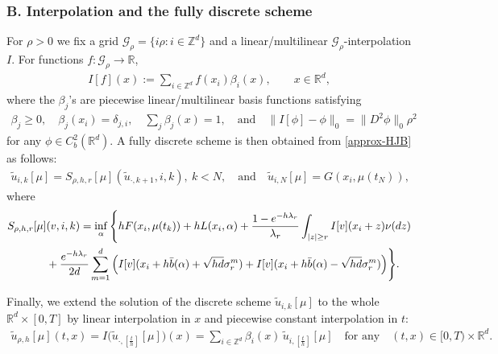 \documentclass[a4paper,  twoside, 10pt, leqno]{amsart}
\newcommand{\Z}{\mathbb{Z}}
\newcommand{\zd}{\mathbb{Z}^d}
\newcommand{\R}{\mathbb{R}}
\newcommand{\rd}{\mathbb{R}^d}
\theoremstyle{remark}
\theoremstyle{definition}
\begin{document}
\subsubsection*{B. Interpolation and the fully discrete scheme}
For $\rho>0$ we fix a grid
    $\mathcal{G}_{\rho} = \{i \rho : i\in \Z^d \}$
and a linear/multilinear $\mathcal{G}_{\rho}$-interpolation $I$. For functions $f: \mathcal{G}_{\rho} \rightarrow \mathbb{R}$,
    \begin{align}\label{linear_interpolation}
        I[f] (x) := \sum_{i\in \Z^d} f(x_i) \beta_i (x), \qquad x \in \R^d,
    \end{align}
   where the $\beta_j$'s are piecewise linear/multilinear basis functions satisfying  
\begin{align*}
   \beta_j\geq 0 , \quad  \beta_j (x_i) = \delta_{j,i},  \quad
   \sum_{j} \beta_j (x) = 1, \quad \text{and} \quad \|I[\phi]
   -\phi\|_{0} = \|D^2\phi\|_0\rho^2 
\end{align*}   
for any $\phi\in C^2_b(\rd)$. A fully discrete scheme is then
obtained from \eqref{approx-HJB} as follows:
\begin{align}\label{schme_HJ}
    \tilde u_{i,k}[\mu] = S_{\rho,h,r} [\mu] (\tilde u_{\cdot,k+1},i,k), \ k<N, \quad \text{and} \quad 
    \tilde u_{i,N}[\mu] = G (x_i, \mu (t_N)), &
\end{align}
where
\begin{align}\label{schme_HJ_S}
  \notag  S_{\rho,h,r} [\mu] & (v,i,k) =   \inf_{\alpha} \Bigg\{ h F ( x_i, \mu(t_k) ) + h L ( x_i, \alpha) + \frac{1-e^{-h\lambda_r}}{\lambda_r} \int_{|z| \geq r}  I [ v ] (x_i + z ) \nu (dz)   \\ 
    & + \frac{e^{-h \lambda_r}}{2d} \sum_{m=1}^d \Big( I [ v ] (x_i + h \bar{b} (\alpha) + \sqrt{hd} \sigma_r^m) + I [ v] (x_i+ h \bar{b} (\alpha) - \sqrt{hd} \sigma_r^m) \Big)   \Bigg\}.
\end{align}


Finally, we extend  the solution of the discrete scheme $\tilde u_{i,k}[\mu]$ to the whole
$\rd\times[0,T]$ by linear interpolation in $x$ and piecewise constant
interpolation in $t$:
\begin{align}\label{extnd_dscrt_schm_HJ}
\tilde u_{\rho,h}[\mu](t,x) = I\big(\tilde u_{\cdot,[\frac{t}{h}]}[\mu]\big)(x)= \sum_{i\in \zd}  \beta_i(x) \, \tilde u_{i,[\frac{t}{h}]}[\mu]\quad \mbox{for any} \quad (t,x)\in [0,T)\times \rd .
\end{align}
\end{document}
